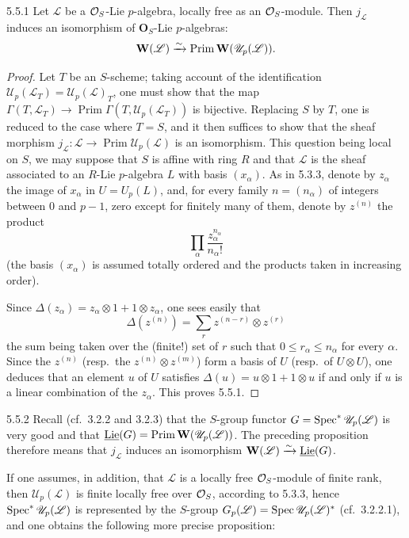 \begin{proposition}{5.5.1}\label{VIIA.5.5.1}
Let $\mathscr L$ be a $\mathcal{O}_S$-Lie $p$-algebra, locally free as an $\mathcal{O}_S$-module. Then $j_{\mathscr L}$ induces an isomorphism of $\mathbf O_S$-Lie $p$-algebras:
\[
\mathbf W(\mathscr L)\xrightarrow{\sim}\operatorname{Prim}\mathbf W(\mathscr U_p(\mathscr L)).
\]
\end{proposition}
\begin{proof}
Let $T$ be an $S$-scheme; taking account of the identification $\mathscr U_p(\mathscr L_T)=\mathscr U_p(\mathscr L)_T$, one must show that the map $\Gamma(T,\mathscr L_T)\to\operatorname{Prim}\Gamma(T,\mathscr U_p(\mathscr L_T))$ is bijective. Replacing $S$ by $T$, one is reduced to the case where $T=S$, and it then suffices to show that the sheaf morphism $j_{\mathscr L}:\mathscr L\to\operatorname{Prim}\mathscr U_p(\mathscr L)$ is an isomorphism. This question being local on $S$, we may suppose that $S$ is affine with ring $R$ and that $\mathscr L$ is the sheaf associated to an $R$-Lie $p$-algebra $L$ with basis $(x_\alpha)$. As in 5.3.3, denote by $z_\alpha$ the image of $x_\alpha$ in $U=U_p(L)$, and, for every family $n=(n_\alpha)$ of integers between $0$ and $p-1$, zero except for finitely many of them, denote by $z^{(n)}$ the product
\[
\prod_\alpha\frac{z_\alpha^{n_\alpha}}{n_\alpha!}
\]
(the basis $(x_\alpha)$ is assumed totally ordered and the products taken in increasing order).

Since $\Delta(z_\alpha)=z_\alpha\otimes1+1\otimes z_\alpha$, one sees easily that
\[
\Delta(z^{(n)})=\sum_r z^{(n-r)}\otimes z^{(r)}
\]
the sum being taken over the (finite!) set of $r$ such that $0\leq r_\alpha\leq n_\alpha$ for every $\alpha$. Since the $z^{(n)}$ (resp.\ the $z^{(n)}\otimes z^{(m)}$) form a basis of $U$ (resp.\ of $U\otimes U$), one deduces that an element $u$ of $U$ satisfies $\Delta(u)=u\otimes1+1\otimes u$ if and only if $u$ is a linear combination of the $z_\alpha$. This proves 5.5.1.
\end{proof}

\begin{remark}{5.5.2}\label{VIIA.5.5.2}
Recall (cf.\ 3.2.2 and 3.2.3) that the $S$-group functor $G=\operatorname{Spec}^*\mathscr U_p(\mathscr L)$ is very good and that $\underline{\operatorname{Lie}}(G)=\operatorname{Prim}\mathbf W(\mathscr U_p(\mathscr L))$. The preceding proposition therefore means that $j_{\mathscr L}$ induces an isomorphism $\mathbf W(\mathscr L)\xrightarrow{\sim}\underline{\operatorname{Lie}}(G)$.

If one assumes, in addition, that $\mathscr L$ is a locally free $\mathcal{O}_S$-module of finite rank, then $\mathscr U_p(\mathscr L)$ is finite locally free over $\mathcal{O}_S$, according to 5.3.3, hence $\operatorname{Spec}^*\mathscr U_p(\mathscr L)$ is represented by the $S$-group $G_p(\mathscr L)=\operatorname{Spec}\mathscr U_p(\mathscr L)^*$ (cf.\ 3.2.2.1), and one obtains the following more precise proposition:
\end{remark}

